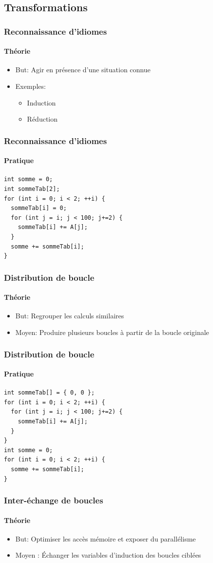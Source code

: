 \documentclass{beamer}
\begin{document}
\subsection{Transformations}
\begin{frame}
\frametitle{Reconnaissance d'idiomes}
\framesubtitle{Théorie}
\begin{itemize}
\item But: Agir en présence d'une situation connue
\item Exemples:
\begin{itemize}
\item Induction
\item Réduction
\end{itemize}
\end{itemize}
\end{frame}

\begin{frame}[fragile]
\frametitle{Reconnaissance d'idiomes}
\framesubtitle{Pratique}
\begin{lstlisting}
int somme = 0;
int sommeTab[2];
for (int i = 0; i < 2; ++i) {
  sommeTab[i] = 0;
  for (int j = i; j < 100; j+=2) {
    sommeTab[i] += A[j];
  }
  somme += sommeTab[i];
}
\end{lstlisting}
\end{frame}

\begin{frame}
\frametitle{Distribution de boucle}
\framesubtitle{Théorie}
\begin{itemize}
\item But: Regrouper les calculs similaires
\item Moyen: Produire plusieurs boucles à partir de la boucle originale
\end{itemize}
\end{frame}

\begin{frame}[fragile]
\frametitle{Distribution de boucle}
\framesubtitle{Pratique}
\begin{lstlisting}
int sommeTab[] = { 0, 0 };
for (int i = 0; i < 2; ++i) {
  for (int j = i; j < 100; j+=2) {
    sommeTab[i] += A[j];
  }
}
int somme = 0;
for (int i = 0; i < 2; ++i) {
  somme += sommeTab[i];
}
\end{lstlisting}
\end{frame}

\begin{frame}
\frametitle{Inter-échange de boucles}
\framesubtitle{Théorie}
\begin{itemize}
\item But: Optimiser les accès mémoire et exposer du parallélisme
\item Moyen : Échanger les variables d'induction des boucles ciblées
\end{itemize}
\end{frame}
\end{document}
